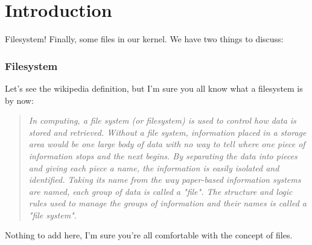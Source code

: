 \documentclass{42-en}
\begin{document}
\chapter{Introduction}
    Filesystem! Finally, some files in our kernel.
    We have two things to discuss:
    \subsection{Filesystem}
    Let's see the wikipedia definition, but I'm sure you all know what a
    filesystem is by now:
    \begin{quotation}
        \textit{In computing, a file system (or filesystem) is used to control 
        how data is stored and retrieved. Without a file system, information 
        placed in a storage area would be one large body of data with no way to 
        tell where one piece of information stops and the next begins. By 
        separating the data into pieces and giving each piece a name, the 
        information is easily isolated and identified. Taking its name from 
        the way paper-based information systems are named, each group of data 
        is called a "file". The structure and logic rules used to manage the 
        groups of information and their names is called a "file system".}
    \end{quotation}
    Nothing to add here, I'm sure you're all comfortable with the concept of
    files.
\end{document}
